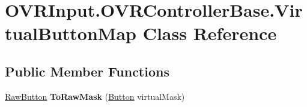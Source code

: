 \hypertarget{class_o_v_r_input_1_1_o_v_r_controller_base_1_1_virtual_button_map}{}\section{O\+V\+R\+Input.\+O\+V\+R\+Controller\+Base.\+Virtual\+Button\+Map Class Reference}
\label{class_o_v_r_input_1_1_o_v_r_controller_base_1_1_virtual_button_map}
\subsection*{Public Member Functions}
\begin{DoxyCompactItemize}
\item 
\mbox{\label{class_o_v_r_input_1_1_o_v_r_controller_base_1_1_virtual_button_map_aedf6ccadef37bd7d9a352064ea6bf6d8}} 
\mbox{\hyperlink{class_o_v_r_input_a9d6423af820e22b93f0b33a4fc4bf77a}{Raw\+Button}} {\bfseries To\+Raw\+Mask} (\mbox{\hyperlink{class_o_v_r_input_aed3cf5b4b5e0669cea0941f61e018ee5}{Button}} virtual\+Mask)
\end{DoxyCompactItemize}
